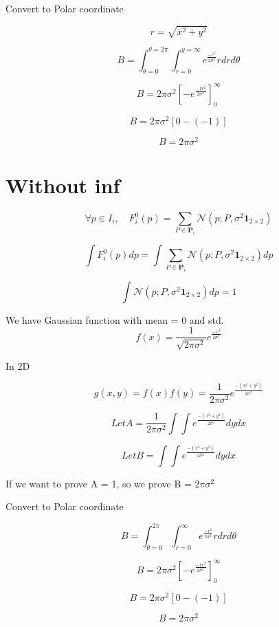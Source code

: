 \documentclass[a4paper]{article}
\theoremstyle{definition}
\theoremstyle{plain}
\begin{document}
Convert to Polar coordinate 

\[ r = \sqrt{x^2 + y^2} \]

\[ B =  \int_{\theta=0}^{\theta=2\pi}\int_{r=0}^{y=\infty} e ^ \frac{-r^2}{2\sigma^2}rdrd\theta\]

\[ B =  2\pi\sigma^2 [-e^\frac{-1r^2}{2\sigma^2}]_0^{\infty} \]

\[ B =  2\pi\sigma^2 [0 - (-1)] \]

\[ B =  2\pi\sigma^2  \]

\section{Without inf}


\[ \forall p \in I_{i}, \quad F_{i}^{0}(p)=\sum_{P \in \mathbf{P}_{i}} \mathcal{N}\left(p ; P, \sigma^{2} \mathbf{1}_{2 \times 2}\right) \]


\[ \int   F_{i}^{0}(p) dp = \int \sum_{P \in \mathbf{P}_{i}} \mathcal{N}\left(p ; P, \sigma^{2} \mathbf{1}_{2 \times 2}\right) dp \]

\[ \int\mathcal{N}\left(p ; P, \sigma^{2} \mathbf{1}_{2 \times 2}\right) dp = 1 \]


We have Gaussian function with mean = 0 and std.
\[ f(x) = \frac{1}{\sqrt{2\pi\sigma^2}} e^\frac{-x^2}{2\sigma^2} \]


In 2D

\[ g(x, y) = f(x)f(y) = \frac{1}{2\pi\sigma^2} e^\frac{-(x^2+y^2)}{2\sigma^2} \]



\[ Let A = \frac{1}{2\pi\sigma^2} \int\int e^\frac{-(x^2+y^2)}{2\sigma^2} dydx\]

\[ Let B =  \int\int e^\frac{-(x^2+y^2)}{2\sigma^2} dydx\]

If we want to prove A = 1, so we prove B = $2\pi\sigma^2$

Convert to Polar coordinate

\[ B =  \int_{\theta=0}^{2\pi}\int_{r=0}^{\infty} e ^ \frac{-r^2}{2\sigma^2}rdrd\theta\]

\[ B =  2\pi\sigma^2 [-e^\frac{-1r^2}{2\sigma^2}]_0^{\infty} \]

\[ B =  2\pi\sigma^2 [0 - (-1)] \]

\[ B =  2\pi\sigma^2  \]
\end{document}
